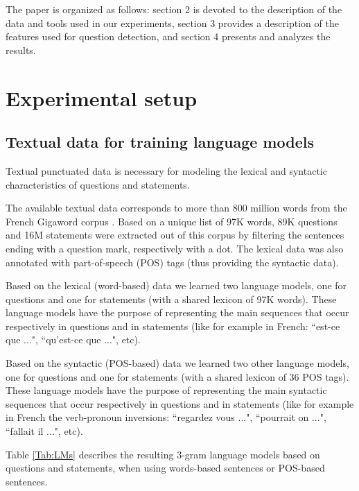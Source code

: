 \documentclass[conference]{IEEEtran}
\begin{document}
The paper is organized as follows: section 2 is devoted to the description of the data and tools used in our experiments, section 3 provides a description of the features used for question detection, and section 4 presents and analyzes the results.


\section{Experimental setup}

\subsection{Textual data for training language models}

Textual punctuated data is necessary for modeling the lexical and syntactic characteristics of questions and statements. 

The available textual data corresponds to more than 800 million words from the French Gigaword corpus \cite{Mendonca:2011}. Based on a unique list of 97K words, 89K questions and 16M statements were extracted out of this corpus by filtering the sentences ending with a question mark, respectively with a dot. The lexical data was also annotated with part-of-speech (POS) tags (thus providing the syntactic data).

Based on the lexical (word-based) data we learned two language models, one for questions and one for statements (with a shared lexicon of 97K words). 
These language models have the purpose of representing the main sequences that occur respectively in questions and in statements (like for example in French: ``est-ce que ...", ``qu'est-ce que ...", etc).

Based on the syntactic (POS-based) data we learned two other language models, one for questions and one for statements (with a shared lexicon of 36 POS tags). 
These language models have the purpose of representing the main syntactic sequences that occur respectively in questions and in statements (like for example in French the verb-pronoun inversions: ``regardez vous ...", ``pourrait on ...", ``fallait il ...", etc).

Table \ref{Tab:LMs} describes the resulting 3-gram language models based on questions and statements, when using words-based sentences or POS-based sentences.
\end{document}
